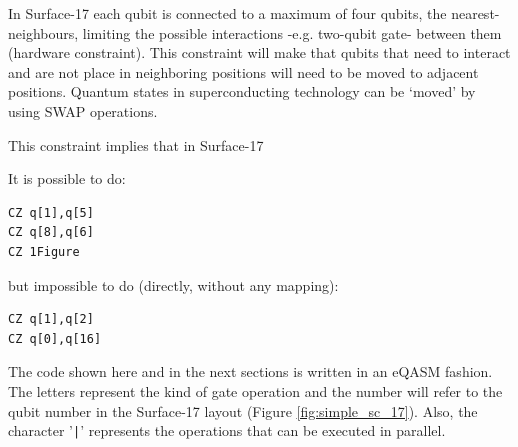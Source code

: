 In Surface-17 each qubit is connected to a maximum of four qubits, the nearest-neighbours, limiting the possible interactions -e.g. two-qubit gate- between them (hardware constraint). This constraint will make that qubits that need to interact and are not place in neighboring positions will need to be moved to adjacent positions. Quantum states in superconducting technology can be `moved' by using SWAP operations.






This constraint implies that in Surface-17





\begin{minipage}[t]{.45\textwidth}

It is possible to do:

\begin{verbatim}
CZ q[1],q[5]
CZ q[8],q[6]
CZ 1Figure\end{verbatim}

\end{minipage}
\hfill %
\begin{minipage}[t]{.45\textwidth}

but impossible to do (directly, without any mapping):

\begin{verbatim}
CZ q[1],q[2]
CZ q[0],q[16]
\end{verbatim}

\end{minipage}

The code shown here and in the next sections is written in an eQASM fashion.
The letters represent the kind of gate operation and the number will refer to the qubit number in the Surface-17 layout (Figure \ref{fig:simple_sc_17}).
Also, the character '\texttt{|}' represents the operations that can be executed in parallel. 




